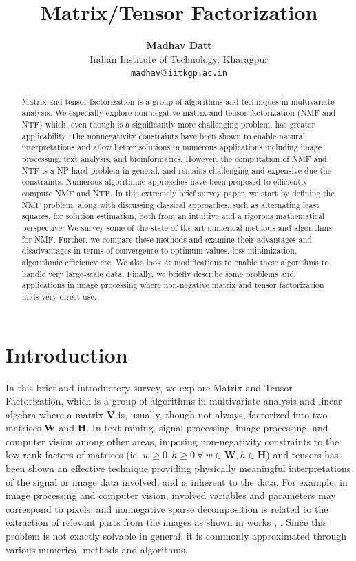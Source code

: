 \documentclass[11pt]{article}
\title{Matrix/Tensor Factorization}
\author{
  \textbf{Madhav Datt} \\
  Indian Institute of Technology, Kharagpur \\
  \texttt{madhav$@$iitkgp.ac.in}
}
\begin{document}
\maketitle
\begin{abstract}
Matrix and tensor factorization is a group of algorithms and techniques in multivariate analysis. We especially explore non-negative matrix and tensor factorization (NMF and NTF) which, even though is a significantly more challenging problem, has greater applicability. The nonnegativity constraints have been shown to enable natural interpretations and allow better solutions in numerous applications including image processing, text analysis, and bioinformatics. However, the computation of NMF and NTF is a NP-hard problem in general, and remains challenging and expensive due the constraints. Numerous algorithmic approaches have been proposed to efficiently compute NMF and NTF. In this extremely brief survey paper, we start by defining the NMF problem, along with discussing classical approaches, such as alternating least squares, for solution estimation, both from an intuitive and a rigorous mathematical perspective. We survey some of the state of the art numerical methods and algorithms for NMF. Further, we compare these methods and examine their advantages and disadvantages in terms of convergence to optimum values, loss minimization, algorithmic efficiency etc. We also look at modifications to enable these algorithms to handle very large-scale data. Finally, we briefly describe some problems and applications in image processing where non-negative matrix and tensor factorization finds very direct use.
\end{abstract}

\section{Introduction}
In this brief and introductory survey, we explore Matrix and Tensor Factorization, which is a group of algorithms in multivariate analysis and linear algebra where a matrix $\mathbf{V}$ is, usually, though not always, factorized into two matrices $\mathbf{W}$ and $\mathbf{H}$. In text mining, signal processing, image processing, and computer vision among other areas, imposing non-negativity constraints to the low-rank factors of matrices (ie. $w \geq 0, h \geq 0 ~ \forall ~ w \in \mathbf{W}, h \in \mathbf{H}$) and tensors has been shown an effective technique providing physically meaningful interpretations of the signal or image data involved, and is inherent to the data.  For example, in image processing and computer vision, involved variables and parameters may correspond to pixels, and nonnegative sparse decomposition is related to the extraction of relevant parts from the images as shown in works \cite{93}, \cite{94}. Since this problem is not exactly solvable in general, it is commonly approximated through various numerical methods and algorithms.
\end{document}
